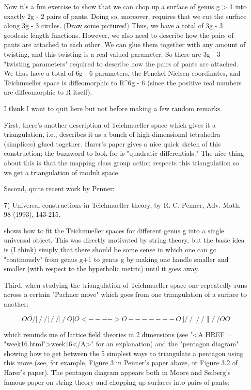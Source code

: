 Now it's a fun exercise to show that we can chop up a surface of genus g
> 1 into exactly 2g - 2 pairs of pants.  Doing so, moreover, requires
that we cut the surface along 3g - 3 circles.  (Draw some pictures!)  
Thus, we have a total of 3g - 3 geodesic length functions.  However, we
also need to describe how the pairs of pants are attached to each other.
We can glue them together with any amount of twisting, and this twisting
is a real-valued parameter.  So there are 3g - 3 "twisting parameters"
required to describe how the pairs of pants are attached.  We thus have
a total of 6g - 6 parameters, the Fenchel-Nielsen coordinates, and
Teichmueller space is diffeomorphic to R^{6g - 6} (since the positive
real numbers are diffeomorphic to R itself).  

I think I want to quit here but not before making a few random remarks.

First, there's another description of Teichmueller space which gives it
a triangulation, i.e., describes it as a bunch of high-dimensional
tetrahedra (simplices) glued together.  Harer's paper gives a nice quick
sketch of this construction; the buzzword to look for is "quadratic
differentials."  The nice thing about this is that the mapping class
group action respects this triangulation so we get a triangulation of
moduli space.  

Second, quite recent work by Penner:

7) Universal constructions in Teichmueller theory, by R. C. Penner, Adv.
Math. 98 (1993), 143-215.

shows how to fit the Teichmueller spaces for different genus g into a
single universal object.  This was directly motivated by string theory,
but the basic idea is (I think) simply that there should be some sense in which
one can go "continously" from genus g+1 to genus g by making one handle
smaller and smaller (with respect to the hyperbolic metric) until it
goes away.  

Third, when studying the triangulation of Teichmueller space one
repeatedly runs across a certain "Pachner move" which goes from one
triangulation of a surface to another:


$$

    O                 O
   /|\               / \    
  / | \             /   \  
 /  |  \           /     \ 
O   |   O <---->  O-------O
 \  |  /           \     /   
  \ | /             \   /          
   \|/               \ /     
    O                 O
$$
    

which reminds me of lattice field theories in 2 dimensions (see "<A HREF = "week16.html">week16</A>"
for an explanation) and the "pentagon diagram" showing how to get
between the 5 simplest ways to triangulate a pentagon using this move
(see, for example, Figure 3 in Penner's paper above, or Figure 3.2 of
Harer's paper).  The pentagon diagram appears both in Moore and
Seiberg's famous paper on string theory and chopping up surfaces into
pairs of pants:

